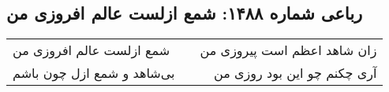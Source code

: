 \begin{center}
\section*{رباعی شماره ۱۴۸۸: شمع ازلست عالم افروزی من}
\label{sec:1488}
\begin{longtable}{l p{0.5cm} r}
شمع ازلست عالم افروزی من
&&
زان شاهد اعظم است پیروزی من
\\
بی‌شاهد و شمع ازل چون باشم
&&
آری چکنم چو این بود روزی من
\\
\end{longtable}
\end{center}
